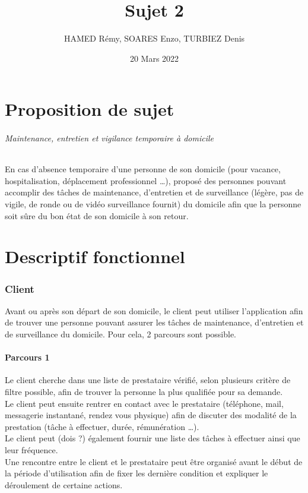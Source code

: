 \documentclass[a4paper,12pt]{article}
\title{Sujet 2}
\author{HAMED Rémy, SOARES Enzo, TURBIEZ Denis}
\date{20 Mars 2022}
\begin{document}
\maketitle
\newpage

\tableofcontents
\newpage

\part{Proposition de sujet}

\paragraph{Maintenance, entretien et vigilance temporaire à domicile}
En cas d'absence temporaire d'une personne de son domicile (pour vacance, hospitalisation, déplacement professionnel …), proposé des personnes pouvant accomplir des tâches de maintenance, d'entretien et de surveillance (légère, pas de vigile, de ronde ou de vidéo surveillance fournit) du domicile afin que la personne soit sûre du bon état de son domicile à son retour.

\newpage
\part{Descriptif fonctionnel}

\section{Client}
Avant ou après son départ de son domicile, le client peut utiliser l'application afin de trouver une personne pouvant assurer les tâches de maintenance, d'entretien et de surveillance du domicile. Pour cela, 2 parcours sont possible.

\subsection{Parcours 1}
Le client cherche dans une liste de prestataire vérifié, selon plusieurs critère de filtre possible, afin de trouver la personne la plus qualifiée pour sa demande.\\
Le client peut ensuite rentrer en contact avec le prestataire (téléphone, mail, messagerie instantané, rendez vous physique) afin de discuter des modalité de la prestation (tâche à effectuer, durée, rémunération …).\\
Le client peut (dois ?) également fournir une liste des tâches à effectuer ainsi que leur fréquence.\\
Une rencontre entre le client et le prestataire peut être organisé avant le début de la période d'utilisation afin de fixer les dernière condition et expliquer le déroulement de certaine actions.\\
\end{document}
